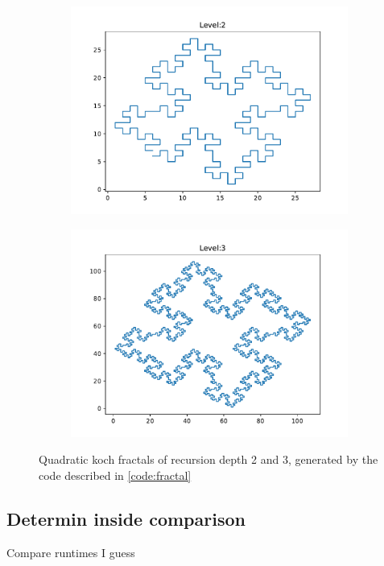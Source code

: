 \documentclass{article}
\begin{document}
\begin{figure}
    \begin{subfigure}{0.5\textwidth}
        \includegraphics[width=\linewidth]{../figs/quad_koch_level2.pdf}
    \end{subfigure}
    \begin{subfigure}{0.5\textwidth}
        \includegraphics[width=\linewidth]{../figs/quad_koch_level3.pdf}
    \end{subfigure}
    \caption{Quadratic koch fractals of recursion depth 2 and 3, generated by the code described in \ref{code:fractal}}
\end{figure}

\subsection{Determin inside comparison}
Compare runtimes I guess
\end{document}
